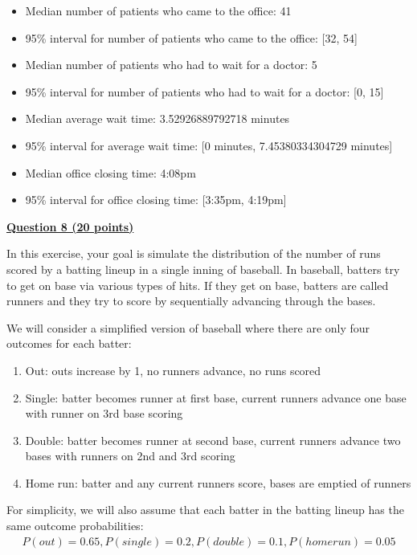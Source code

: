 \documentclass[12pt]{article}
\begin{document}
\begin{itemize}
\item Median number of patients who came to the office: 41
\item 95\% interval for number of patients who came to the office: [32, 54]
\item Median number of patients who had to wait for a doctor: 5
\item 95\% interval for number of patients who had to wait for a doctor: [0, 15]
\item Median average wait time: 3.52926889792718 minutes
\item 95\% interval for average wait time: [0 minutes, 7.45380334304729 minutes]
\item Median office closing time: 4:08pm
\item 95\% interval for office closing time: [3:35pm, 4:19pm]
\end{itemize}

\bigskip

{\underline{\bf Question 8 (20 points)}}  

In this exercise, your goal is simulate the distribution of the number of runs scored by a batting lineup in a single inning of baseball.  In baseball, batters try to get on base via various types of hits.  If they get on base, batters are called runners and they try to score by sequentially advancing through the bases. 

We will consider a simplified version of baseball where there are only four outcomes for each batter:
\begin{enumerate} 
\item Out: outs increase by 1, no runners advance, no runs scored
\item Single: batter becomes runner at first base, current runners advance one base with runner on 3rd base scoring
\item Double: batter becomes runner at second base, current runners advance two bases with runners on 2nd and 3rd scoring
\item Home run: batter and any current runners score, bases are emptied of runners
\end{enumerate}

For simplicity, we will also assume that each batter in the batting lineup has the same outcome probabilities: 
\begin{eqnarray*}
P(out)  =  0.65, P(single)  =  0.2, P(double)  =  0.1, P(homerun)  =  0.05
\end{eqnarray*}
\end{document}
